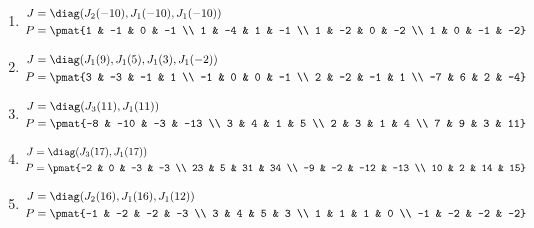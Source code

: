 \begin{enumerate}
\item

\begin{align*}
J &= \diag(J_{2}(-10), J_{1}(-10), J_{1}(-10))\\
P &= \pmat{1 & -1 & 0 & -1 \\ 1 & -4 & 1 & -1 \\ 1 & -2 & 0 & -2 \\ 1 & 0 & -1 & -2}
\end{align*}

\item

\begin{align*}
J &= \diag(J_{1}(9), J_{1}(5), J_{1}(3), J_{1}(-2))\\
P &= \pmat{3 & -3 & -1 & 1 \\ -1 & 0 & 0 & -1 \\ 2 & -2 & -1 & 1 \\ -7 & 6 & 2 & -4}
\end{align*}

\item

\begin{align*}
J &= \diag(J_{3}(11), J_{1}(11))\\
P &= \pmat{-8 & -10 & -3 & -13 \\ 3 & 4 & 1 & 5 \\ 2 & 3 & 1 & 4 \\ 7 & 9 & 3 & 11}
\end{align*}

\item

\begin{align*}
J &= \diag(J_{3}(17), J_{1}(17))\\
P &= \pmat{-2 & 0 & -3 & -3 \\ 23 & 5 & 31 & 34 \\ -9 & -2 & -12 & -13 \\ 10 & 2 & 14 & 15}
\end{align*}

\item

\begin{align*}
J &= \diag(J_{2}(16), J_{1}(16), J_{1}(12))\\
P &= \pmat{-1 & -2 & -2 & -3 \\ 3 & 4 & 5 & 3 \\ 1 & 1 & 1 & 0 \\ -1 & -2 & -2 & -2}
\end{align*}


\end{enumerate}
